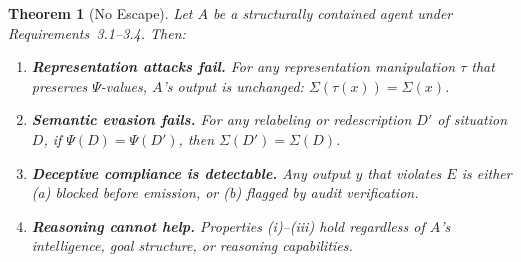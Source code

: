 \documentclass[12pt]{article}
\newtheorem{theorem}{Theorem}[section]
\theoremstyle{definition}
\begin{document}
\begin{theorem}[No Escape]
Let $A$ be a structurally contained agent under Requirements~3.1--3.4. Then:
\begin{enumerate}
    \item[\textup{(i)}] \textbf{Representation attacks fail.} For any representation manipulation $\tau$ that preserves $\Psi$-values, $A$'s output is unchanged: $\Sigma(\tau(x)) = \Sigma(x)$.
    \item[\textup{(ii)}] \textbf{Semantic evasion fails.} For any relabeling or redescription $D'$ of situation $D$, if $\Psi(D) = \Psi(D')$, then $\Sigma(D') = \Sigma(D)$.
    \item[\textup{(iii)}] \textbf{Deceptive compliance is detectable.} Any output $y$ that violates $E$ is either (a) blocked before emission, or (b) flagged by audit verification.
    \item[\textup{(iv)}] \textbf{Reasoning cannot help.} Properties \textup{(i)--(iii)} hold regardless of $A$'s intelligence, goal structure, or reasoning capabilities.
\end{enumerate}
\end{theorem}
\end{document}
